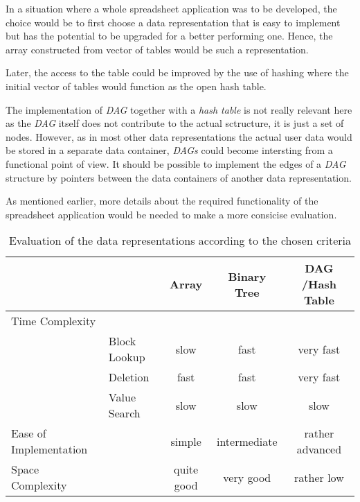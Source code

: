 \documentclass[a4paper,11pt,twoside]{article}
\begin{document}
In a situation where a whole spreadsheet application was to be
developed, the choice would be to first choose a data representation
that is easy to implement but has the potential to be upgraded for a
better performing one. Hence, the array constructed from vector of
tables would be such a representation.

Later, the access to the table could be improved by the use of hashing
where the initial vector of tables would function as the open hash
table.


The implementation of \textit{DAG} together with a \textit{hash table}
is not really relevant here as the \textit{DAG} itself does not
contribute to the actual sctructure, it is just a set of
nodes. However, as in most other data representations the actual user
data would be stored in a separate data container, \textit{DAGs} could
become intersting from a functional point of view. It should be
possible to implement the edges of a \textit{DAG} structure by pointers between
the data containers of another data representation. 


As mentioned earlier, more details about the required functionality of
the spreadsheet application would be needed to make a more consicise
evaluation. 

\begin{table}[]
\centering
\caption{Evaluation of the data representations according to the chosen criteria}
\label{tab:eval}
\begin{tabular}{llccc}
                       &              & Array      & Binary Tree  &
                       DAG /Hash Table \\ \hline
Time Complexity        &              &            &              &
\\
                       & Block Lookup & slow       & fast         &
                       very fast       \\
                       & Deletion     & fast       & fast         &
                       very fast       \\
                       & Value Search & slow       & slow         &
                       slow            \\
Ease of Implementation &              & simple     & intermediate &
rather advanced \\
Space Complexity       &              & quite good & very good    &
rather low     
\end{tabular}
\end{table}


\end{document}
